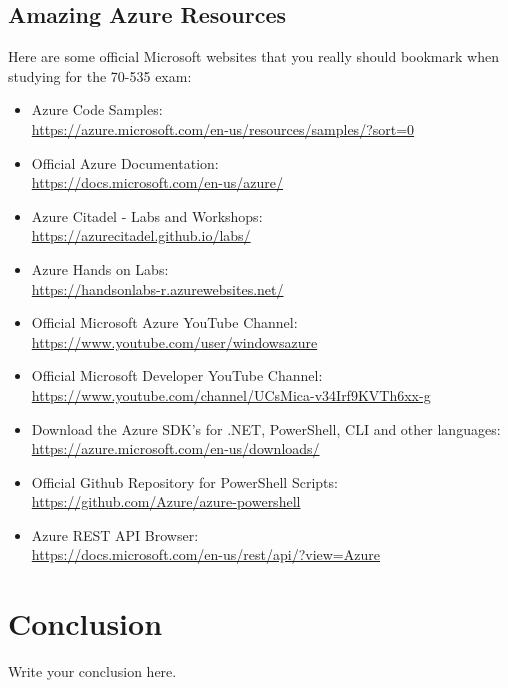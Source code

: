 \documentclass{article}
\begin{document}
\subsection{Amazing Azure Resources}
Here are some official Microsoft websites that you really should bookmark when studying for the 70-535 exam:
\begin{itemize}
	\item Azure Code Samples:\\
	\url{https://azure.microsoft.com/en-us/resources/samples/?sort=0}
	
	\item Official Azure Documentation:\\
	\url{https://docs.microsoft.com/en-us/azure/}
	
	\item Azure Citadel - Labs and Workshops:\\
	\url{https://azurecitadel.github.io/labs/}
	
	\item Azure Hands on Labs:\\
	\url{https://handsonlabs-r.azurewebsites.net/}
	
	\item Official Microsoft Azure YouTube Channel:\\
	\url{https://www.youtube.com/user/windowsazure}
	
	\item Official Microsoft Developer YouTube Channel:\\
	\url{https://www.youtube.com/channel/UCsMica-v34Irf9KVTh6xx-g}
	
	\item Download the Azure SDK's for .NET, PowerShell, CLI and other languages:\\
	\url{https://azure.microsoft.com/en-us/downloads/}
	
	\item Official Github Repository for PowerShell Scripts:\\
	\url{https://github.com/Azure/azure-powershell}
	
	\item Azure REST API Browser:\\
	\url{https://docs.microsoft.com/en-us/rest/api/?view=Azure}
	
\end{itemize}



\section{Conclusion}
Write your conclusion here.
\end{document}
